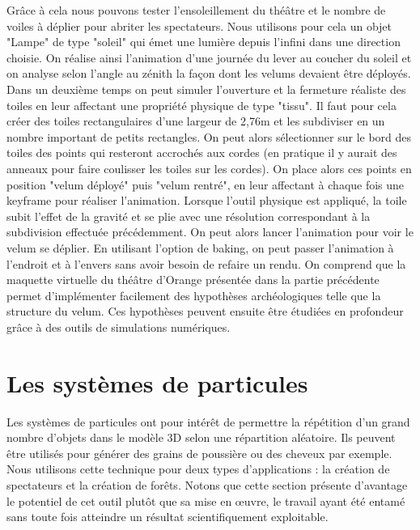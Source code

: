Grâce à cela nous pouvons tester l'ensoleillement du théâtre et le nombre de voiles à déplier pour abriter les spectateurs. Nous utilisons pour cela un objet "Lampe" de type "soleil" qui émet une lumière depuis l'infini dans une direction choisie. On réalise ainsi l'animation d'une journée du lever au coucher du soleil et on analyse selon l'angle au zénith la façon dont les \glspl{velum} devaient être déployés. Dans un deuxième temps on peut simuler l'ouverture et la fermeture réaliste des toiles en leur affectant une propriété physique de type "tissu". Il faut pour cela créer des toiles rectangulaires d'une largeur de 2,76m et les subdiviser en un nombre important de petits rectangles. On peut alors sélectionner sur le bord des toiles des points qui resteront accrochés aux cordes (en pratique il y aurait des anneaux pour faire coulisser les toiles sur les cordes). On place alors ces points en position "\gls{velum} déployé" puis "\gls{velum} rentré", en leur affectant à chaque fois une \gls{keyframe} pour réaliser l'animation. Lorsque l'outil physique est appliqué, la toile subit l'effet de la gravité et se plie avec une résolution correspondant à la subdivision effectuée précédemment. On peut alors lancer l'animation pour voir le \gls{velum} se déplier. En utilisant l'option de \gls{baking}, on peut passer l'animation à l'endroit et à l'envers sans avoir besoin de refaire un rendu. On comprend que la maquette virtuelle du théâtre d'Orange présentée dans la partie précédente permet d'implémenter facilement des hypothèses archéologiques telle que la structure du \gls{velum}. Ces hypothèses peuvent ensuite être étudiées en profondeur grâce à des outils de simulations numériques.



\section{Les systèmes de \glspl{particule}}
Les systèmes de \glspl{particule} ont pour intérêt de permettre la répétition d'un grand nombre d'objets dans le modèle 3D selon une répartition aléatoire. Ils peuvent être utilisés pour générer des grains de poussière ou des cheveux par exemple. Nous utilisons cette technique pour deux types d'applications : la création de spectateurs et la création de forêts. Notons que cette section présente d'avantage le potentiel de cet outil plutôt que sa mise en \oe{}uvre, le travail ayant été entamé sans toute fois atteindre un résultat scientifiquement exploitable.

